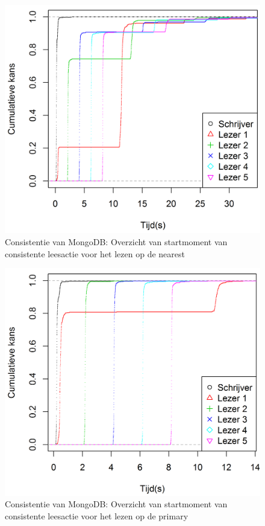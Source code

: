 \begin{figure}[ht!] 
	\centering
	\includegraphics[width=.70\textwidth]{img/Observaties/MongoDB/ECDF-plot-Start-updateRawData-majority-nearest-1}
	\caption{Consistentie van MongoDB: Overzicht van startmoment van consistente leesactie voor het lezen op de nearest }
	\label{fig:consistentie-mongodb-nearest}
\end{figure}
\begin{figure}[htb!] 
	\centering
	\includegraphics[width=.70\textwidth]{img/Observaties/MongoDB/ECDF-plot-Start-updateRawData-majority-primary-1}
	\caption{Consistentie van MongoDB: Overzicht van startmoment van consistente leesactie voor het lezen op de primary }
	\label{fig:consistentie-mongodb-primary}
\end{figure}
